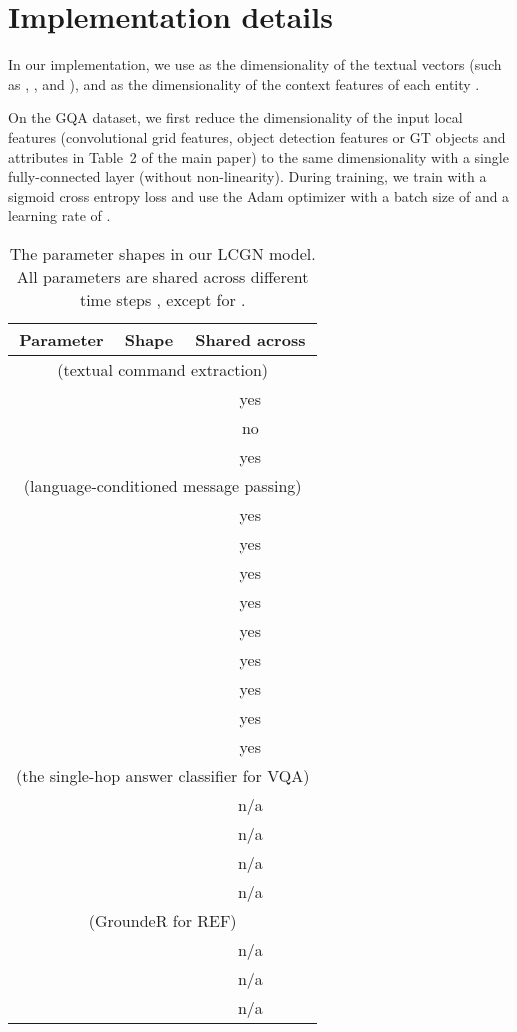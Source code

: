 \documentclass[10pt,twocolumn,letterpaper]{article}
\begin{document}
\section{Implementation details}

In our implementation, we use  as the dimensionality of the textual vectors (such as , , and ), and  as the dimensionality of the context features  of each entity .

On the GQA dataset, we first reduce the dimensionality of the input local features  (convolutional grid features, object detection features or GT objects and attributes in Table~2 of the main paper) to the same dimensionality  with a single fully-connected layer (without non-linearity). During training, we train with a sigmoid cross entropy loss and use the Adam optimizer \cite{kingma2014adam} with a batch size of  and a learning rate of .

\begin{table}[b]
\vspace{-1em}
\begin{center}
\begin{tabular}{ccc}
\toprule
Parameter & Shape & Shared across  \\
\midrule
\multicolumn{3}{c}{(textual command extraction)} \\
 &  & yes \\
 &  & no \\
 &  & yes \\
\midrule
\multicolumn{3}{c}{(language-conditioned message passing)} \\
 &  & yes \\
 &  & yes \\
 &  & yes \\
 &  & yes \\
 &  & yes \\
 &  & yes \\
 &  & yes \\
 &  & yes \\
 &  & yes \\
\midrule
\multicolumn{3}{c}{(the single-hop answer classifier for VQA)} \\
 &  & n/a \\
 &  & n/a \\
 &  & n/a \\
 &  & n/a \\
\midrule
\multicolumn{3}{c}{(GroundeR for REF)} \\
 &  & n/a \\
 &  & n/a \\
 &  & n/a \\
\bottomrule
\end{tabular}
\end{center}
\vspace{-0.5em}
\caption{The parameter shapes in our LCGN model. All parameters are shared across different time steps , except for .}
\label{tab:parameter_shape}
\end{table}
\end{document}
